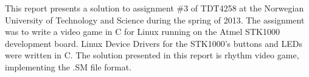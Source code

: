 This report presents a solution to assignment \#3 of TDT4258 at the Norwegian University of Technology and Science during the spring of 2013.
The assignment was to write a video game in C for Linux running on the Atmel STK1000 development board.
Linux Device Drivers for the STK1000's buttons and LEDs were written in C.
The solution presented in this report is rhythm video game, implementing the .SM file format.